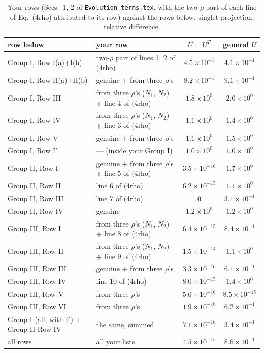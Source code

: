\documentclass[10pt]{article}
\numberwithin{equation}{section}
\newcommand{\new}[1]{{\color{blue}#1}}
\begin{document}
\begin{table}[H]\centering\small
\caption{Your rows (Secs.~1, 2 of \texttt{Evolution\_terms.tex}, with the two-$\rho$ part of each line of Eq.~(4rho) attributed to its row) against the rows below, singlet projection, relative difference.}\label{tab:rows}
\begin{tabular}{@{}llcc@{}}\toprule
row below & your row & $U=U^T$ & general $U$\\\midrule
Group I, Row I(a)+I(b) & two-$\rho$ part of lines 1, 2 of (4rho) & $4.5\times10^{-1}$ & $4.1\times10^{-1}$\\
Group I, Row II(a)+II(b) & genuine + from three $\rho$'s & $8.2\times10^{-1}$ & $9.1\times10^{-1}$\\
Group I, Row III & from three $\rho$'s ($N_1$, $N_2$) + line 4 of (4rho) & $1.8\times10^{0}$ & $2.0\times10^{0}$\\
Group I, Row IV & from three $\rho$'s ($N_1$, $N_2$) + line 3 of (4rho) & $1.1\times10^{0}$ & $1.4\times10^{0}$\\
Group I, Row V & genuine + from three $\rho$'s & $1.1\times10^{0}$ & $1.5\times10^{0}$\\
Group I, Row I$'$ & --- (inside your Group I) & $1.0\times10^{0}$ & $1.0\times10^{0}$\\
\midrule
Group II, Row I & genuine + from three $\rho$'s + line 5 of (4rho) & \new{$3.5\times10^{-16}$} & $1.7\times10^{0}$\\
Group II, Row II & line 6 of (4rho) & \new{$6.2\times10^{-15}$} & $1.1\times10^{0}$\\
Group II, Row III & line 7 of (4rho) & \new{$0$} & $3.1\times10^{-1}$\\
Group II, Row IV & genuine & $1.2\times10^{0}$ & $1.2\times10^{0}$\\
\midrule
Group III, Row I & from three $\rho$'s ($N_1$, $N_2$) + line 8 of (4rho) & \new{$6.4\times10^{-15}$} & $8.4\times10^{-1}$\\
Group III, Row II & from three $\rho$'s ($N_1$, $N_2$) + line 9 of (4rho) & \new{$1.5\times10^{-14}$} & $1.1\times10^{0}$\\
Group III, Row III & genuine + from three $\rho$'s & \new{$3.3\times10^{-16}$} & $6.1\times10^{-1}$\\
Group III, Row IV & line 10 of (4rho) & \new{$8.0\times10^{-15}$} & $1.4\times10^{0}$\\
Group III, Row V & from three $\rho$'s & \new{$5.6\times10^{-16}$} & \new{$8.5\times10^{-15}$}\\
Group III, Row VI & from three $\rho$'s & \new{$1.9\times10^{-16}$} & $6.2\times10^{-1}$\\
\midrule
Group I (all, with I$'$) + Group II Row IV & the same, summed & \new{$7.1\times10^{-16}$} & $3.4\times10^{-1}$\\
all rows & all your lists & \new{$4.5\times10^{-15}$} & $8.6\times10^{-1}$\\
\bottomrule
\end{tabular}
\end{table}
\end{document}

